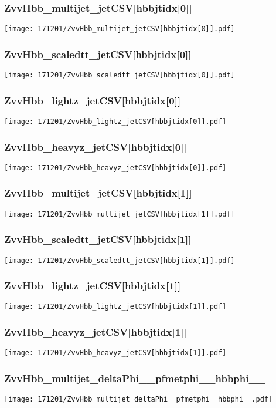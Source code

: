 \begin{frame}
   \frametitle{\small ZvvHbb\_multijet\_jetCSV[hbbjtidx[0]]}
   \centering
   \texttt{[image: 171201/ZvvHbb\_multijet\_jetCSV[hbbjtidx[0]].pdf]}
\end{frame}

\begin{frame}
   \frametitle{\small ZvvHbb\_scaledtt\_jetCSV[hbbjtidx[0]]}
   \centering
   \texttt{[image: 171201/ZvvHbb\_scaledtt\_jetCSV[hbbjtidx[0]].pdf]}
\end{frame}

\begin{frame}
   \frametitle{\small ZvvHbb\_lightz\_jetCSV[hbbjtidx[0]]}
   \centering
   \texttt{[image: 171201/ZvvHbb\_lightz\_jetCSV[hbbjtidx[0]].pdf]}
\end{frame}

\begin{frame}
   \frametitle{\small ZvvHbb\_heavyz\_jetCSV[hbbjtidx[0]]}
   \centering
   \texttt{[image: 171201/ZvvHbb\_heavyz\_jetCSV[hbbjtidx[0]].pdf]}
\end{frame}

\begin{frame}
   \frametitle{\small ZvvHbb\_multijet\_jetCSV[hbbjtidx[1]]}
   \centering
   \texttt{[image: 171201/ZvvHbb\_multijet\_jetCSV[hbbjtidx[1]].pdf]}
\end{frame}

\begin{frame}
   \frametitle{\small ZvvHbb\_scaledtt\_jetCSV[hbbjtidx[1]]}
   \centering
   \texttt{[image: 171201/ZvvHbb\_scaledtt\_jetCSV[hbbjtidx[1]].pdf]}
\end{frame}

\begin{frame}
   \frametitle{\small ZvvHbb\_lightz\_jetCSV[hbbjtidx[1]]}
   \centering
   \texttt{[image: 171201/ZvvHbb\_lightz\_jetCSV[hbbjtidx[1]].pdf]}
\end{frame}

\begin{frame}
   \frametitle{\small ZvvHbb\_heavyz\_jetCSV[hbbjtidx[1]]}
   \centering
   \texttt{[image: 171201/ZvvHbb\_heavyz\_jetCSV[hbbjtidx[1]].pdf]}
\end{frame}

\begin{frame}
   \frametitle{\small ZvvHbb\_multijet\_deltaPhi\_\_pfmetphi\_\_hbbphi\_\_}
   \centering
   \texttt{[image: 171201/ZvvHbb\_multijet\_deltaPhi\_\_pfmetphi\_\_hbbphi\_\_.pdf]}
\end{frame}

